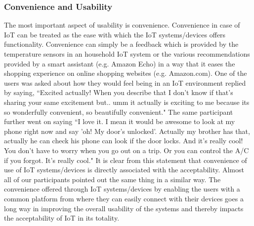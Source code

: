 \subsubsection{Convenience and Usability}
The most important aspect of usability is convenience. Convenience in case of IoT can be treated as the ease with which the IoT systems/devices offers functionality. Convenience can simply be a feedback which is provided by the temperature sensors in an household IoT system or the various recommendations provided by a smart assistant (e.g. Amazon Echo) in a way that it eases the shopping experience on online shopping websites (e.g. Amazon.com). One of the users was asked about how they would feel being in an IoT environment replied by saying, ``Excited actually! When you describe that I don't know if that's sharing your same excitement but.. umm it actually is exciting to me because its so wonderfully convenient, so beautifully convenient." The same participant further went on saying ``I love it. I mean it would be awesome to look at my phone right now and say 'oh! My door's unlocked'. Actually my brother has that, actually he can check his phone can look if the door locks. And it's really cool! You don't have to worry when you go out on a trip. Or you can control the A/C if you forgot. It's really cool."  It is clear from this statement that convenience of use of IoT systems/devices is directly associated with the acceptability. Almost all of our participants pointed out the same thing in a similar way. The convenience offered through IoT systems/devices by enabling the users with a common platform from where they can easily connect with their devices goes a long way in improving the overall usability of the systems and thereby impacts the acceptability of IoT in its totality. 

